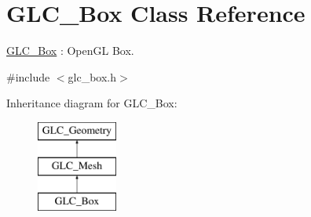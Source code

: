 \hypertarget{class_g_l_c___box}{\section{G\-L\-C\-\_\-\-Box Class Reference}
\label{class_g_l_c___box}
}


\hyperlink{class_g_l_c___box}{G\-L\-C\-\_\-\-Box} \-: Open\-G\-L Box.  




{\ttfamily \#include $<$glc\-\_\-box.\-h$>$}

Inheritance diagram for G\-L\-C\-\_\-\-Box\-:\begin{figure}[H]
\begin{center}
\leavevmode
\includegraphics[height=3.000000cm]{class_g_l_c___box}
\end{center}
\end{figure}
